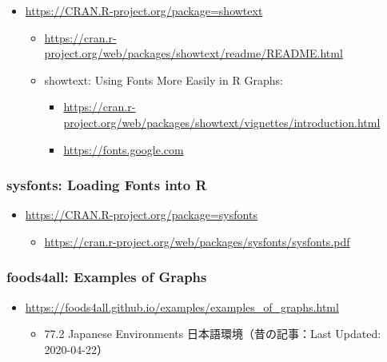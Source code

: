 \documentclass[
  xelatex, ja=standard]{bxjsbook}
\providecommand{\tightlist}{%
  \setlength{\itemsep}{0pt}\setlength{\parskip}{0pt}}
\theoremstyle{definition}
\theoremstyle{definition}
\theoremstyle{definition}
\theoremstyle{definition}
\theoremstyle{remark}
\begin{document}
\begin{itemize}
\tightlist
\item
  \url{https://CRAN.R-project.org/package=showtext}

  \begin{itemize}
  \tightlist
  \item
    \url{https://cran.r-project.org/web/packages/showtext/readme/README.html}
  \item
    showtext: Using Fonts More Easily in R Graphs:

    \begin{itemize}
    \tightlist
    \item
      \url{https://cran.r-project.org/web/packages/showtext/vignettes/introduction.html}
    \item
      \url{https://fonts.google.com}
    \end{itemize}
  \end{itemize}
\end{itemize}

\hypertarget{sysfonts-loading-fonts-into-r}{%
\subsubsection{sysfonts: Loading Fonts into R}\label{sysfonts-loading-fonts-into-r}}

\begin{itemize}
\tightlist
\item
  \url{https://CRAN.R-project.org/package=sysfonts}

  \begin{itemize}
  \tightlist
  \item
    \url{https://cran.r-project.org/web/packages/sysfonts/sysfonts.pdf}
  \end{itemize}
\end{itemize}

\hypertarget{foods4all-examples-of-graphs}{%
\subsubsection{foods4all: Examples of Graphs}\label{foods4all-examples-of-graphs}}

\begin{itemize}
\tightlist
\item
  \url{https://foods4all.github.io/examples/examples_of_graphs.html}

  \begin{itemize}
  \tightlist
  \item
    77.2 Japanese Environments 日本語環境（昔の記事：Last Updated: 2020-04-22）
  \end{itemize}
\end{itemize}
\end{document}
